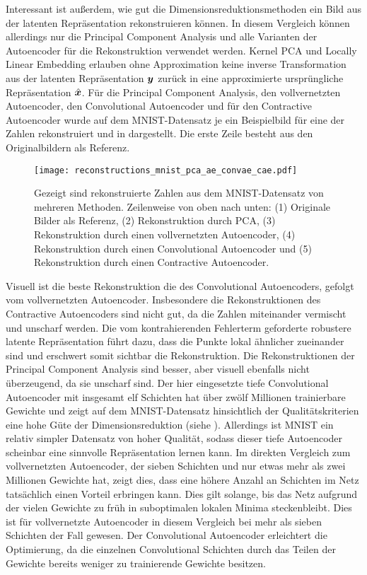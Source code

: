 Interessant ist außerdem, wie gut die Dimensionsreduktionsmethoden ein Bild aus der latenten
Repräsentation rekonstruieren können. In diesem Vergleich können allerdings nur die Principal
Component Analysis und alle Varianten der Autoencoder für die Rekonstruktion verwendet werden.
Kernel PCA und Locally Linear Embedding erlauben ohne Approximation keine inverse Transformation
aus der latenten Repräsentation $\bm{y}$ zurück in eine approximierte ursprüngliche
Repräsentation $\hat{\bm{x}}$. Für die Principal Component Analysis, den vollvernetzten
Autoencoder, den Convolutional Autoencoder und für den Contractive Autoencoder wurde auf dem
MNIST-Datensatz je ein Beispielbild für eine der Zahlen rekonstruiert und in
 dargestellt. Die erste Zeile besteht aus den Originalbildern als
Referenz.
\begin{figure}[ht]
	\centering
	\texttt{[image: reconstructions\_mnist\_pca\_ae\_convae\_cae.pdf]}
	\caption[Rekonstruierte MNIST-Zahlen]{Gezeigt sind rekonstruierte Zahlen aus dem MNIST-Datensatz von mehreren Methoden. Zeilenweise von oben nach unten: (1) Originale Bilder als Referenz, (2) Rekonstruktion durch PCA, (3) Rekonstruktion durch einen vollvernetzten Autoencoder, (4) Rekonstruktion durch einen Convolutional Autoencoder und (5) Rekonstruktion durch einen Contractive Autoencoder.}
	\label{fig:MNIST-reconstructions}
\end{figure}
Visuell ist die beste Rekonstruktion die des Convolutional Autoencoders, gefolgt vom vollvernetzten Autoencoder. Insbesondere die Rekonstruktionen des Contractive Autoencoders sind nicht gut, da die Zahlen miteinander vermischt und unscharf werden. Die vom kontrahierenden Fehlerterm geforderte robustere latente Repräsentation führt dazu, dass die Punkte lokal ähnlicher zueinander sind und erschwert somit sichtbar die Rekonstruktion. Die Rekonstruktionen der Principal Component Analysis sind besser, aber visuell ebenfalls nicht überzeugend, da sie unscharf sind. Der hier eingesetzte tiefe Convolutional Autoencoder mit insgesamt elf Schichten hat über zwölf Millionen trainierbare Gewichte und zeigt auf dem MNIST-Datensatz hinsichtlich der Qualitätskriterien eine hohe Güte der Dimensionsreduktion (siehe ). Allerdings ist MNIST ein relativ simpler Datensatz von hoher Qualität, sodass dieser tiefe Autoencoder scheinbar eine sinnvolle Repräsentation lernen kann. Im direkten Vergleich zum vollvernetzten Autoencoder, der sieben Schichten und nur etwas mehr als zwei Millionen Gewichte hat, zeigt dies, dass eine höhere Anzahl an Schichten im Netz tatsächlich einen Vorteil erbringen kann. Dies gilt solange, bis das Netz aufgrund der vielen Gewichte zu früh in suboptimalen lokalen Minima steckenbleibt. Dies ist für vollvernetzte Autoencoder in diesem Vergleich bei mehr als sieben Schichten der Fall gewesen. Der Convolutional Autoencoder erleichtert die Optimierung, da die einzelnen Convolutional Schichten durch das Teilen der Gewichte bereits weniger zu trainierende Gewichte besitzen.

